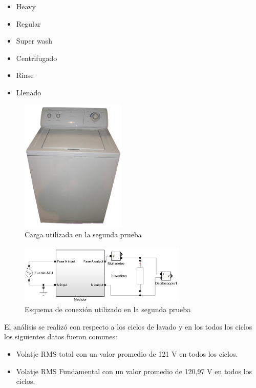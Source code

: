 \begin{itemize}
  \itemsep0em
  \item Heavy
  \item Regular
  \item Super wash
  \item Centrifugado
  \item Rinse
  \item Llenado
\end{itemize}
\begin{figure}[H]
  \begin{center}
      \includegraphics[width = 5cm]{4Resultados/lavadora2.png}
      \caption{ Carga utilizada en la segunda prueba } 
      \label{fig:montaje2}
 \end{center}
\end{figure}
\begin{figure}[H]
  \begin{center}
      \includegraphics[width = 8cm]{4Resultados/conexion2.jpeg}
      \caption{ Esquema de conexión utilizado en la segunda prueba } 
      \label{fig:conexion2}
 \end{center}
\end{figure}
El análisis se realizó con respecto a los ciclos de lavado y en los todos los ciclos los siguientes datos fueron comunes:

\begin{itemize}
  \itemsep0em
  \item Volatje RMS total con un valor promedio de 121 V en todos los ciclos.
  \item Volatje RMS Fundamental con un valor promedio de 120,97 V en todos los ciclos.
\end{itemize}

